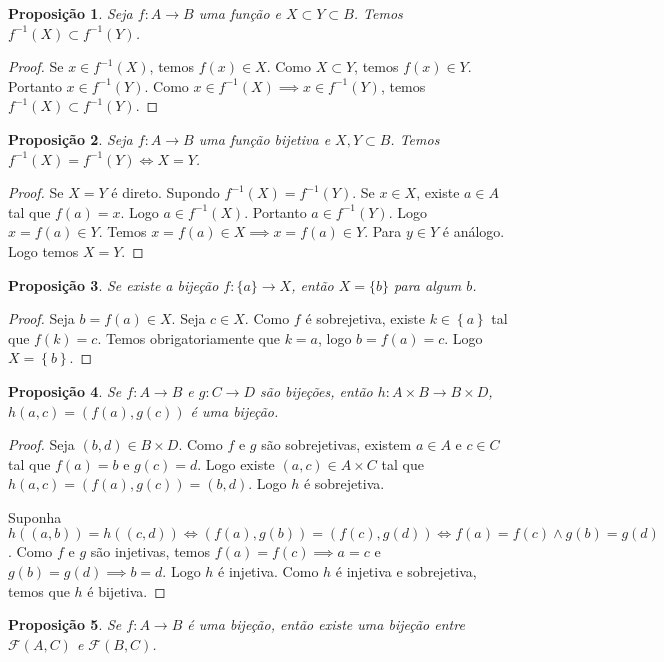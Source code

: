 \documentclass{article}
\theoremstyle{plain}
\newtheorem{prop}{Proposição}[section]
\theoremstyle{definition}
\theoremstyle{remark}
\begin{document}
\begin{prop}
	Seja $f:A\to B$ uma função e $X\subset Y \subset B$. Temos $f^{-1}(X) \subset f^{-1}(Y)$.
\end{prop}
\begin{proof}
	Se $x\in f^{-1}(X)$, temos $f(x)\in X$. Como $X\subset Y$, temos $f(x)\in Y$. Portanto  $x\in f^{-1}(Y)$. Como $x\in f^{-1}(X) \implies x\in f^{-1}(Y)$, temos $f^{-1}(X) \subset f^{-1}(Y)$.
\end{proof}
\begin{prop}
	Seja $f:A\to B$ uma função bijetiva e $X,Y \subset B$. Temos $f^{-1}(X) = f^{-1}(Y) \iff X = Y$.
\end{prop}
\begin{proof}
	Se $X = Y$ é direto. Supondo $f^{-1}(X) = f^{-1}(Y)$. Se $x\in X$, existe $a\in A$ tal que $f(a) = x$. Logo  $a\in f^{-1}(X)$. Portanto $a\in f^{-1}(Y)$. Logo $x = f(a) \in Y$.  Temos $ x = f(a) \in X \implies x = f(a) \in Y$. Para $y\in Y$ é análogo. Logo temos $X = Y$.
\end{proof}
\begin{prop}
	Se existe a bijeção $f: \{a\} \to X$, então $X = \{b\}$ para algum $b$.
\end{prop}
\begin{proof}
	Seja $b = f(a) \in X$. Seja $c\in X$. Como $f$ é sobrejetiva, existe $k\in \left\{a\right\}$ tal que $f(k) = c$. Temos obrigatoriamente que $k = a$, logo $b = f(a) = c$. Logo  $X =\left\{b\right\}$.
\end{proof}
\begin{prop}
	Se $f:A\to B$ e $g: C \to D$ são bijeções, então $h : A\times B \to B\times D$, $h(a,c) = (f(a),g(c))$ é uma bijeção.
\end{prop}
\begin{proof}
	Seja $(b,d) \in B\times D$. Como $f$ e $g$ são sobrejetivas, existem $a\in A$ e $c\in C$ tal que $f(a) = b$ e $g(c) = d$. Logo existe $(a,c) \in A\times C$ tal que $h(a,c) = (f(a),g(c)) = (b,d)$. Logo $h$ é sobrejetiva.

	Suponha $h((a,b)) = h((c,d)) \iff (f(a), g(b)) = (f(c), g(d)) \iff f(a) = f(c) \land g(b) = g(d)$. Como $f$ e $g$ são injetivas, temos $f(a) = f(c) \implies a =c $ e $g(b) = g(d) \implies b = d$. 
	Logo $h$ é injetiva. Como $h$ é injetiva e sobrejetiva, temos que  $h$ é bijetiva.

\end{proof}
\begin{prop}
	Se $f:A\to B$ é uma bijeção, então existe uma bijeção entre $\mathcal{F}(A, C)$ e $\mathcal{F}(B,C)$.
\end{prop}
\end{document}
